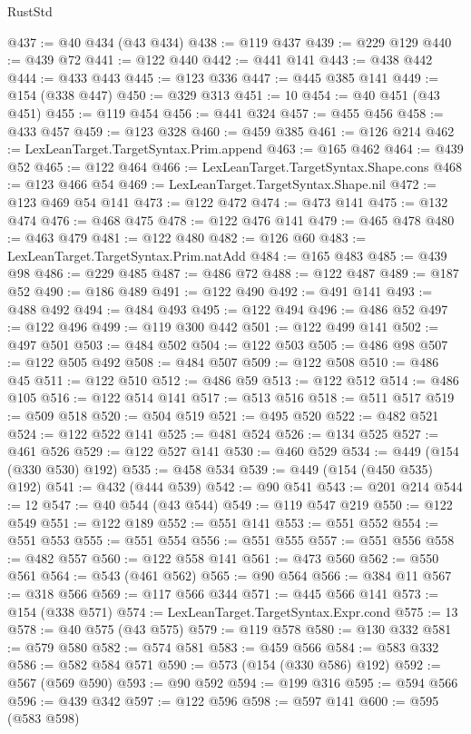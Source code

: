 \begin{lexlean}{RustStd}
\begin{coremodule}
@437 := @40 @434 (@43 @434)
@438 := @119 @437
@439 := @229 @129
@440 := @439 @72
@441 := @122 @440
@442 := @441 @141
@443 := @438 @442
@444 := @433 @443
@445 := @123 @336
@447 := @445 @385 @141
@449 := @154 (@338 @447)
@450 := @329 @313
@451 := 10
@454 := @40 @451 (@43 @451)
@455 := @119 @454
@456 := @441 @324
@457 := @455 @456
@458 := @433 @457
@459 := @123 @328
@460 := @459 @385
@461 := @126 @214
@462 := LexLeanTarget.TargetSyntax.Prim.append
@463 := @165 @462
@464 := @439 @52
@465 := @122 @464
@466 := LexLeanTarget.TargetSyntax.Shape.cons
@468 := @123 @466 @54
@469 := LexLeanTarget.TargetSyntax.Shape.nil
@472 := @123 @469 @54 @141
@473 := @122 @472
@474 := @473 @141
@475 := @132 @474
@476 := @468 @475
@478 := @122 @476 @141
@479 := @465 @478
@480 := @463 @479
@481 := @122 @480
@482 := @126 @60
@483 := LexLeanTarget.TargetSyntax.Prim.natAdd
@484 := @165 @483
@485 := @439 @98
@486 := @229 @485
@487 := @486 @72
@488 := @122 @487
@489 := @187 @52
@490 := @186 @489
@491 := @122 @490
@492 := @491 @141
@493 := @488 @492
@494 := @484 @493
@495 := @122 @494
@496 := @486 @52
@497 := @122 @496
@499 := @119 @300 @442
@501 := @122 @499 @141
@502 := @497 @501
@503 := @484 @502
@504 := @122 @503
@505 := @486 @98
@507 := @122 @505 @492
@508 := @484 @507
@509 := @122 @508
@510 := @486 @45
@511 := @122 @510
@512 := @486 @59
@513 := @122 @512
@514 := @486 @105
@516 := @122 @514 @141
@517 := @513 @516
@518 := @511 @517
@519 := @509 @518
@520 := @504 @519
@521 := @495 @520
@522 := @482 @521
@524 := @122 @522 @141
@525 := @481 @524
@526 := @134 @525
@527 := @461 @526
@529 := @122 @527 @141
@530 := @460 @529
@534 := @449 (@154 (@330 @530) @192)
@535 := @458 @534
@539 := @449 (@154 (@450 @535) @192)
@541 := @432 (@444 @539)
@542 := @90 @541
@543 := @201 @214
@544 := 12
@547 := @40 @544 (@43 @544)
@549 := @119 @547 @219
@550 := @122 @549
@551 := @122 @189
@552 := @551 @141
@553 := @551 @552
@554 := @551 @553
@555 := @551 @554
@556 := @551 @555
@557 := @551 @556
@558 := @482 @557
@560 := @122 @558 @141
@561 := @473 @560
@562 := @550 @561
@564 := @543 (@461 @562)
@565 := @90 @564
@566 := @384 @11
@567 := @318 @566
@569 := @117 @566 @344
@571 := @445 @566 @141
@573 := @154 (@338 @571)
@574 := LexLeanTarget.TargetSyntax.Expr.cond
@575 := 13
@578 := @40 @575 (@43 @575)
@579 := @119 @578
@580 := @130 @332
@581 := @579 @580
@582 := @574 @581
@583 := @459 @566
@584 := @583 @332
@586 := @582 @584 @571
@590 := @573 (@154 (@330 @586) @192)
@592 := @567 (@569 @590)
@593 := @90 @592
@594 := @199 @316
@595 := @594 @566
@596 := @439 @342
@597 := @122 @596
@598 := @597 @141
@600 := @595 (@583 @598)

\end{coremodule}
\end{lexlean}
